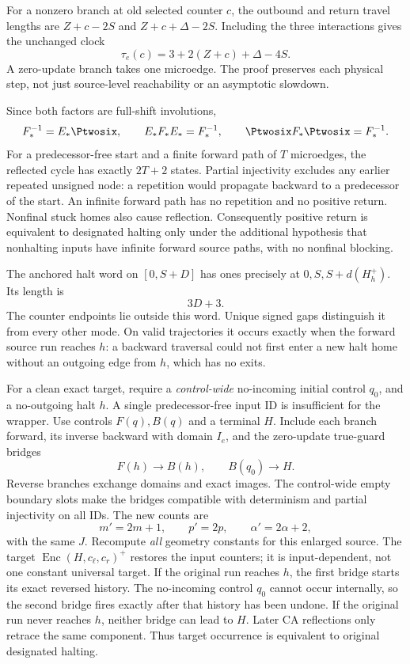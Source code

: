 \documentclass[11pt,a4paper]{article}
\numberwithin{equation}{section}
\newcommand{\Estar}{E_*}\newcommand{\Fstar}{F_*}
\begin{document}
For a nonzero branch at old selected counter $c$, the outbound and return travel lengths are $Z+c-2S$ and $Z+c+\Delta-2S$. Including the three interactions gives the unchanged clock
\begin{equation}\label{fpa:tr:eq:clock}
\tau_e(c)=3+2(Z+c)+\Delta-4S.
\end{equation}
A zero-update branch takes one microedge. The proof preserves each physical step, not just source-level reachability or an asymptotic slowdown.

Since both factors are full-shift involutions,
\[
\Fstar^{-1}=\Estar\Ptwosix,\qquad
\Estar\Fstar\Estar=\Fstar^{-1},\qquad
\Ptwosix\Fstar\Ptwosix=\Fstar^{-1}.
\]
For a predecessor-free start and a finite forward path of $T$ microedges, the reflected cycle has exactly $2T+2$ states. Partial injectivity excludes any earlier repeated unsigned node: a repetition would propagate backward to a predecessor of the start. An infinite forward path has no repetition and no positive return. Nonfinal stuck homes also cause reflection. Consequently positive return is equivalent to designated halting only under the additional hypothesis that nonhalting inputs have infinite forward source paths, with no nonfinal blocking.

The anchored halt word on $[0,S+D]$ has ones precisely at $0,S,S+d(H_h^+)$. Its length is
\[
3D+3.
\]
The counter endpoints lie outside this word. Unique signed gaps distinguish it from every other mode. On valid trajectories it occurs exactly when the forward source run reaches $h$: a backward traversal could not first enter a new halt home without an outgoing edge from $h$, which has no exits.

For a clean exact target, require a \emph{control-wide} no-incoming initial control $q_0$, and a no-outgoing halt $h$. A single predecessor-free input ID is insufficient for the wrapper. Use controls $F(q),B(q)$ and a terminal $H$. Include each branch forward, its inverse backward with domain $I_e$, and the zero-update true-guard bridges
\[
F(h)\longrightarrow B(h),\qquad B(q_0)\longrightarrow H.
\]
Reverse branches exchange domains and exact images. The control-wide empty boundary slots make the bridges compatible with determinism and partial injectivity on all IDs. The new counts are
\[
m'=2m+1,\qquad p'=2p,\qquad \alpha'=2\alpha+2,
\]
with the same $J$. Recompute \emph{all} geometry constants for this enlarged source. The target $\operatorname{Enc}(H,c_\ell,c_r)^+$ restores the input counters; it is input-dependent, not one constant universal target. If the original run reaches $h$, the first bridge starts its exact reversed history. The no-incoming control $q_0$ cannot occur internally, so the second bridge fires exactly after that history has been undone. If the original run never reaches $h$, neither bridge can lead to $H$. Later CA reflections only retrace the same component. Thus target occurrence is equivalent to original designated halting.
\end{document}
